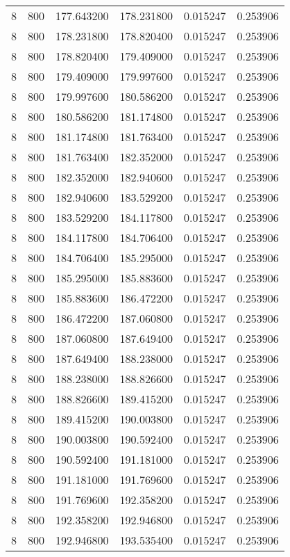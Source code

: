 \begin{longtable}{rrrrrr}
8 & 800 & 177.643200 & 178.231800 & 0.015247 & 0.253906 \\
8 & 800 & 178.231800 & 178.820400 & 0.015247 & 0.253906 \\
8 & 800 & 178.820400 & 179.409000 & 0.015247 & 0.253906 \\
8 & 800 & 179.409000 & 179.997600 & 0.015247 & 0.253906 \\
8 & 800 & 179.997600 & 180.586200 & 0.015247 & 0.253906 \\
8 & 800 & 180.586200 & 181.174800 & 0.015247 & 0.253906 \\
8 & 800 & 181.174800 & 181.763400 & 0.015247 & 0.253906 \\
8 & 800 & 181.763400 & 182.352000 & 0.015247 & 0.253906 \\
8 & 800 & 182.352000 & 182.940600 & 0.015247 & 0.253906 \\
8 & 800 & 182.940600 & 183.529200 & 0.015247 & 0.253906 \\
8 & 800 & 183.529200 & 184.117800 & 0.015247 & 0.253906 \\
8 & 800 & 184.117800 & 184.706400 & 0.015247 & 0.253906 \\
8 & 800 & 184.706400 & 185.295000 & 0.015247 & 0.253906 \\
8 & 800 & 185.295000 & 185.883600 & 0.015247 & 0.253906 \\
8 & 800 & 185.883600 & 186.472200 & 0.015247 & 0.253906 \\
8 & 800 & 186.472200 & 187.060800 & 0.015247 & 0.253906 \\
8 & 800 & 187.060800 & 187.649400 & 0.015247 & 0.253906 \\
8 & 800 & 187.649400 & 188.238000 & 0.015247 & 0.253906 \\
8 & 800 & 188.238000 & 188.826600 & 0.015247 & 0.253906 \\
8 & 800 & 188.826600 & 189.415200 & 0.015247 & 0.253906 \\
8 & 800 & 189.415200 & 190.003800 & 0.015247 & 0.253906 \\
8 & 800 & 190.003800 & 190.592400 & 0.015247 & 0.253906 \\
8 & 800 & 190.592400 & 191.181000 & 0.015247 & 0.253906 \\
8 & 800 & 191.181000 & 191.769600 & 0.015247 & 0.253906 \\
8 & 800 & 191.769600 & 192.358200 & 0.015247 & 0.253906 \\
8 & 800 & 192.358200 & 192.946800 & 0.015247 & 0.253906 \\
8 & 800 & 192.946800 & 193.535400 & 0.015247 & 0.253906 \\

\end{longtable}
